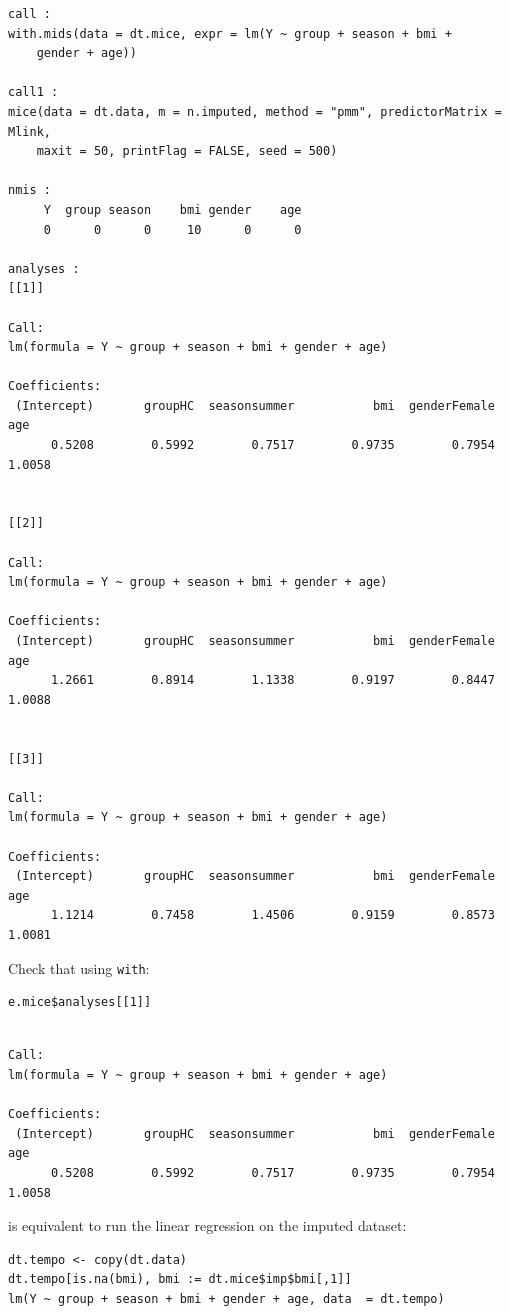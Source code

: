 \documentclass[12pt]{article}
\begin{document}
\begin{verbatim}
call :
with.mids(data = dt.mice, expr = lm(Y ~ group + season + bmi + 
    gender + age))

call1 :
mice(data = dt.data, m = n.imputed, method = "pmm", predictorMatrix = Mlink, 
    maxit = 50, printFlag = FALSE, seed = 500)

nmis :
     Y  group season    bmi gender    age 
     0      0      0     10      0      0 

analyses :
[[1]]

Call:
lm(formula = Y ~ group + season + bmi + gender + age)

Coefficients:
 (Intercept)       groupHC  seasonsummer           bmi  genderFemale           age  
      0.5208        0.5992        0.7517        0.9735        0.7954        1.0058  


[[2]]

Call:
lm(formula = Y ~ group + season + bmi + gender + age)

Coefficients:
 (Intercept)       groupHC  seasonsummer           bmi  genderFemale           age  
      1.2661        0.8914        1.1338        0.9197        0.8447        1.0088  


[[3]]

Call:
lm(formula = Y ~ group + season + bmi + gender + age)

Coefficients:
 (Intercept)       groupHC  seasonsummer           bmi  genderFemale           age  
      1.1214        0.7458        1.4506        0.9159        0.8573        1.0081
\end{verbatim}

Check that using \texttt{with}:
\lstset{language=r,label= ,caption= ,captionpos=b,numbers=none}
\begin{lstlisting}
e.mice$analyses[[1]]
\end{lstlisting}

\begin{verbatim}

Call:
lm(formula = Y ~ group + season + bmi + gender + age)

Coefficients:
 (Intercept)       groupHC  seasonsummer           bmi  genderFemale           age  
      0.5208        0.5992        0.7517        0.9735        0.7954        1.0058
\end{verbatim}

is equivalent to run the linear regression on the imputed dataset:
\lstset{language=r,label= ,caption= ,captionpos=b,numbers=none}
\begin{lstlisting}
dt.tempo <- copy(dt.data)
dt.tempo[is.na(bmi), bmi := dt.mice$imp$bmi[,1]]
lm(Y ~ group + season + bmi + gender + age, data  = dt.tempo)
\end{lstlisting}
\end{document}
